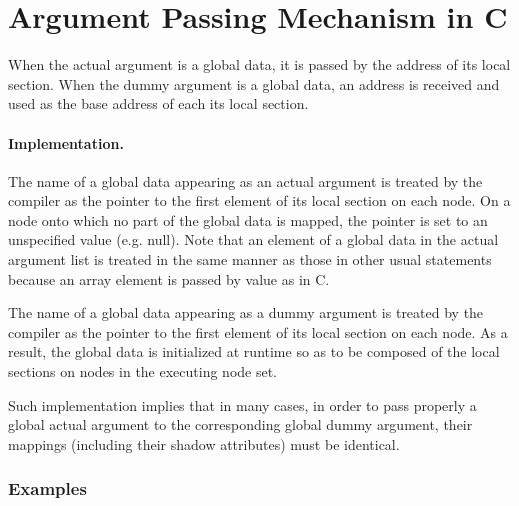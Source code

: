\section{Argument Passing Mechanism in {\XMP} C}

When the actual argument is a global data, it is passed by the address
of its local section.
%
When the dummy argument is a global data, an address is received and
used as the base address of each its local section.


\paragraph{Implementation.}

The name of a global data appearing as an actual argument is
treated by the {\XMP} compiler as the pointer to the first element of
its local section on each node.
%
On a node onto which no part of the global data is mapped, the pointer
is set to an unspecified value (e.g. null).
%
Note that an element of a global data in the actual argument list is
treated in the same manner as those in other usual statements because an
array element is passed by value as in C.

The name of a global data appearing as a dummy argument is
treated by the {\XMP} compiler as the pointer to the first element of
its local section on each node.
%
As a result, the global data is initialized at runtime so as to be
composed of the local sections on nodes in the executing node set.

Such implementation implies that in many cases, in order to pass
properly a global actual argument to the corresponding global dummy 
argument, their mappings (including their shadow attributes) must be
identical.

\subsubsection*{Examples}

